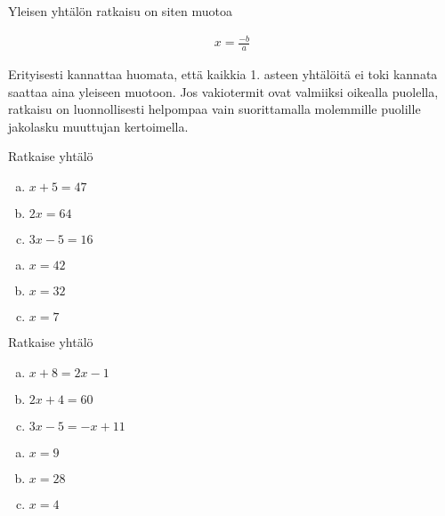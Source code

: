 Yleisen yhtälön ratkaisu on siten muotoa

\begin{align*}
  x = \frac{-b}{a}
\end{align*}

Erityisesti kannattaa huomata, että kaikkia 1. asteen yhtälöitä ei toki
kannata saattaa aina yleiseen muotoon. Jos vakiotermit ovat valmiiksi oikealla
puolella, ratkaisu on luonnollisesti helpompaa vain suorittamalla
molemmille puolille jakolasku muuttujan kertoimella.

\Harjoitustehtavat

\begin{tehtava}
    Ratkaise yhtälö
    \begin{enumerate}[(a)]
        \item $x + 5 = 47$
        \item $2x = 64$
        \item $3x - 5 = 16$
    \end{enumerate}
    \begin{vastaus}
        \begin{enumerate}[(a)]
            \item $x = 42$
            \item $x = 32$
            \item $x = 7$
        \end{enumerate}
    \end{vastaus}
\end{tehtava}

\begin{tehtava}
    Ratkaise yhtälö
    \begin{enumerate}[(a)]
        \item $x + 8 = 2x - 1$
        \item $2x + 4 = 60$
        \item $3x - 5 = -x + 11$
    \end{enumerate}
    \begin{vastaus}
        \begin{enumerate}[(a)]
            \item $x = 9$
            \item $x = 28$
            \item $x = 4$
        \end{enumerate}
    \end{vastaus}
\end{tehtava}

